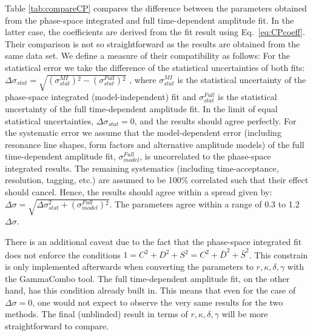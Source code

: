 \noindent 
Table \ref{tab:compareCP} compares the difference between the \CP parameters obtained from the phase-space integrated and full
time-dependent amplitude fit. 
In the latter case, the \CP coefficients are derived from the fit result using Eq.~\ref{eq:CPcoeff}. 
Their comparison is not so straightforward as the results are obtained from the same data set. 
We define a measure of their compatibility as follows:
For the statistical error we take the difference of the statistical uncertainties of both fits:
$\Delta \sigma_{stat} = \sqrt{ (\sigma^{MI}_{stat} ){}^2 - (\sigma^{Full}_{stat}) {}^2 }$ ,
where $\sigma^{MI}_{stat}$ is the statistical uncertainty of the phase-space integrated (model-independent) fit 
and $\sigma^{Full}_{stat}$ is the statistical uncertainty of the full time-dependent amplitude fit.
In the limit of equal statistical uncertainties, $\Delta \sigma_{stat} = 0$,  and the results should agree perfectly.
For the systematic error we assume that the model-dependent error (including resonance line shapes, form factors and alternative amplitude models) of the full time-dependent amplitude fit, 
$\sigma^{Full}_{model}$, is uncorrelated 
to the phase-space integrated results.
The remaining systematics (including time-acceptance, resolution, tagging, etc.) are assumed to be 100\% correlated such that their effect should cancel.
Hence, the results should agree within a spread given by:
$\Delta \sigma = \sqrt{ \Delta \sigma_{stat}^2 + (\sigma^{Full}_{model}){}^2}$.
The \CP parameters agree within a range of 0.3 to 1.2 $\Delta \sigma$. 

There is an additional caveat due to the fact that the phase-space integrated fit does not enforce the conditions 
$1 = C^2 + D^2 + S^2 = C^2 + \bar D^2 + \bar S^2$.
This constrain is only implemented afterwards when converting the \CP parameters to $r, \kappa, \delta, \gamma$ with the GammaCombo tool.
The full time-dependent amplitude fit, on the other hand, has this condition already built in. 
This means that even for the case of $\Delta \sigma = 0$, one would not expect to observe the very same results for the two methods.
The final (unblinded) result in terms of $r, \kappa, \delta, \gamma$ will be more straightforward to compare.

